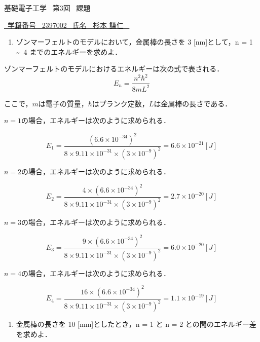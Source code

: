 \documentclass{classes/report}
\begin{document}
基礎電子工学 \ 第3回 \ 課題

\begin{flushright}
    \underline{\ 学籍番号 \ 2397002 \ 氏名 \ 杉本 謙仁 \ }
\end{flushright}

\bigskip

\begin{enumerate}
    \item ゾンマーフェルトのモデルにおいて，金属棒の長さを 3 [nm]として，n = 1 \sim \ 4 までのエネルギーを求めよ．
\end{enumerate}

ゾンマーフェルトのモデルにおけるエネルギーは次の式で表される．
\begin{equation}
    E_n = \frac{n^2\hbar^2}{8mL^2}
\end{equation}

ここで，$m$は電子の質量，$\hbar$はプランク定数，$L$は金属棒の長さである．

$n=1$の場合，エネルギーは次のように求められる．

\begin{equation}
    E_1 = \frac{(6.6 \times 10^{-34})^2}{8 \times 9.11 \times 10^{-31} \times (3 \times 10^{-9} )^2} = 6.6 \times 10^{-21} [J]
\end{equation}

$n=2$の場合，エネルギーは次のように求められる．

\begin{equation}
    E_2 = \frac{4 \times (6.6 \times 10^{-34})^2}{8 \times 9.11 \times 10^{-31} \times (3 \times 10^{-9} )^2} = 2.7 \times 10^{-20} [J]
\end{equation}

$n=3$の場合，エネルギーは次のように求められる．

\begin{equation}
    E_3 = \frac{9 \times (6.6 \times 10^{-34})^2}{8 \times 9.11 \times 10^{-31} \times (3 \times 10^{-9} )^2} = 6.0 \times 10^{-20} [J]
\end{equation}

$n=4$の場合，エネルギーは次のように求められる．

\begin{equation}
    E_4 = \frac{16 \times (6.6 \times 10^{-34})^2}{8 \times 9.11 \times 10^{-31} \times (3 \times 10^{-9} )^2} = 1.1 \times 10^{-19} [J]
\end{equation}

\bigskip

\begin{enumerate}[resume]
    \item 金属棒の長さを 10 [mm]としたとき，n = 1 と n = 2 との間のエネルギー差を求めよ．
\end{enumerate}
\end{document}

